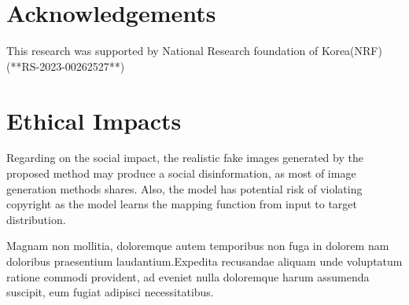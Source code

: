 \documentclass[letterpaper]{article} %
\begin{document}

\section{Acknowledgements}
This research was supported by National Research foundation of Korea(NRF) (**RS-2023-00262527**)

\section{Ethical Impacts}
Regarding on the social impact, the realistic fake images generated by the proposed method may produce a social disinformation, as most of image generation methods shares. Also, the model has potential risk of violating copyright as the model learns the mapping function from input to target distribution.


Magnam non mollitia, doloremque autem temporibus non fuga in dolorem nam doloribus praesentium laudantium.Expedita recusandae aliquam unde voluptatum ratione commodi provident, ad eveniet nulla doloremque harum assumenda suscipit, eum fugiat adipisci necessitatibus.\clearpage

\end{document}
